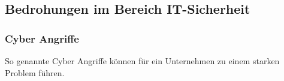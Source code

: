 \documentclass[12pt, oneside]{article}
\begin{document}

\newpage
\subsection{Bedrohungen im Bereich IT-Sicherheit}
\subsubsection{Cyber Angriffe}
So genannte Cyber Angriffe können für ein Unternehmen zu einem starken Problem führen.
\end{document}
